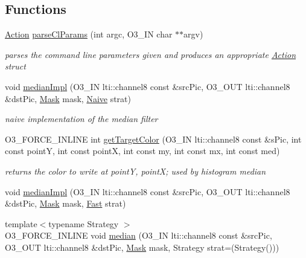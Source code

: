 \subsection*{Functions}
\begin{DoxyCompactItemize}
\item 
\hyperlink{structapp_1_1_action}{Action} \hyperlink{namespaceapp_aea85a2e5d29188c9ddb6ffc74fe20262}{parse\+Cl\+Params} (int argc, O3\+\_\+\+I\+N char $\ast$$\ast$argv)
\begin{DoxyCompactList}\small\item\em parses the command line parameters given and produces an appropriate \hyperlink{structapp_1_1_action}{Action} struct \end{DoxyCompactList}\item 
void \hyperlink{namespaceapp_ad7bc3746aa2d65b3fac91c4aac880a30}{median\+Impl} (O3\+\_\+\+I\+N lti\+::channel8 const \&src\+Pic, O3\+\_\+\+O\+U\+T lti\+::channel8 \&dst\+Pic, \hyperlink{structapp_1_1_mask}{Mask} mask, \hyperlink{structapp_1_1_naive}{Naive} strat)
\begin{DoxyCompactList}\small\item\em \textquotesingle{}naive\textquotesingle{} implementation of the median filter \end{DoxyCompactList}\item 
O3\+\_\+\+F\+O\+R\+C\+E\+\_\+\+I\+N\+L\+I\+N\+E int \hyperlink{namespaceapp_ae9f26815bebcd007aaa56f52289e732e}{get\+Target\+Color} (O3\+\_\+\+I\+N lti\+::channel8 const \&s\+Pic, int const point\+Y, int const point\+X, int const my, int const mx, int const med)
\begin{DoxyCompactList}\small\item\em returns the color to write at point\+Y, point\+X; used by histogram median \end{DoxyCompactList}\item 
void \hyperlink{namespaceapp_a966eb67a6bd4bf4cb5d7c4c1807c6e09}{median\+Impl} (O3\+\_\+\+I\+N lti\+::channel8 const \&src\+Pic, O3\+\_\+\+O\+U\+T lti\+::channel8 \&dst\+Pic, \hyperlink{structapp_1_1_mask}{Mask} mask, \hyperlink{structapp_1_1_fast}{Fast} strat)
\item 
{\footnotesize template$<$typename Strategy $>$ }\\O3\+\_\+\+F\+O\+R\+C\+E\+\_\+\+I\+N\+L\+I\+N\+E void \hyperlink{namespaceapp_a8cf2a58dae2a837a4d27e2d5cf142494}{median} (O3\+\_\+\+I\+N lti\+::channel8 const \&src\+Pic, O3\+\_\+\+O\+U\+T lti\+::channel8 \&dst\+Pic, \hyperlink{structapp_1_1_mask}{Mask} mask, Strategy strat=(Strategy()))
$$
\end{DoxyCompactItemize}
